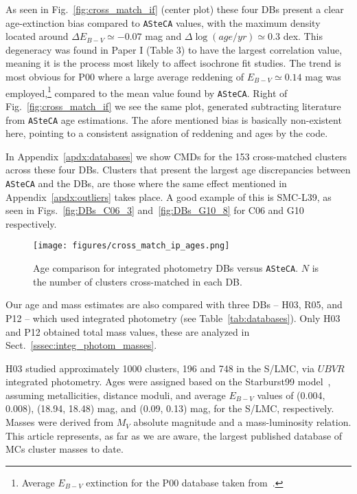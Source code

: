 \documentclass{aa}
\begin{document}
As seen in Fig.~\ref{fig:cross_match_if} (center plot) these four DBs
present a clear age-extinction bias compared to \texttt{ASteCA} values, with the
maximum density located around $\Delta E_{B-V}{\simeq-}0.07$ mag and
$\Delta\log(age/yr){\simeq}0.3$ dex.
This degeneracy was found in Paper I (Table 3) to have the largest
correlation value, meaning it is the process most likely to affect isochrone fit
studies.
The trend is most obvious for P00 where a large average reddening of
$E_{B-V}{\simeq}0.14$ mag was employed,\footnote{Average $E_{B-V}$
extinction for the P00 database taken from~\cite{de_Grijs_2006}.}
compared to the mean value found by \texttt{ASteCA}.
%
Right of Fig.~\ref{fig:cross_match_if} we see the same plot,
generated subtracting literature from \texttt{ASteCA} age estimations.
The afore mentioned bias is basically non-existent here, pointing to a
consistent assignation of reddening and ages by the code.

In Appendix~\ref{apdx:databases} we show CMDs for the 153 cross-matched
clusters across these four DBs.
Clusters that present the largest age discrepancies between
\texttt{ASteCA} and the DBs, are those where the same effect mentioned in
Appendix~\ref{apdx:outliers} takes place. A good example of this is SMC-L39, as
seen in Figs.~\ref{fig:DBs_C06_3} and~\ref{fig:DBs_G10_8} for C06 and G10
respectively.\\


%

\begin{figure}
\centering
\texttt{[image: figures/cross\_match\_ip\_ages.png]}
\caption{Age comparison for integrated photometry DBs versus \texttt{ASteCA}.
$N$ is the number of clusters cross-matched in each DB.\@}
\label{fig:cross_match_ip_age}
\end{figure}

Our age and mass estimates are also compared with three DBs -- H03, R05, and P12
-- which used integrated photometry (see Table~\ref{tab:databases}). Only H03
and P12 obtained total mass values, these are analyzed in
Sect.~\ref{sssec:integ_photom_masses}.

H03 studied approximately 1000 clusters, 196 and 748 in the S/LMC, via $UBVR$
integrated photometry.
Ages were assigned based on the Starburst99
model~\citep{Leitherer_1999}, assuming metallicities, distance moduli, and
average $E_{B-V}$ values of (0.004, 0.008), (18.94, 18.48) mag, and 
(0.09, 0.13) mag, for the S/LMC, respectively.
%
Masses were derived from $M_V$ absolute magnitude and a mass-luminosity
relation.
This article represents, as far as we are aware, the largest published database
of MCs cluster masses to date.
\end{document}

